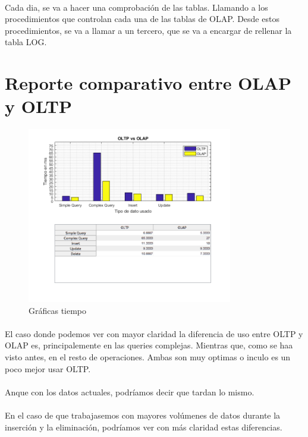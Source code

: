 \documentclass[a4paper 
,twoside
]{article}
\begin{document}
  \paragraph{}
  Cada dia, se va a hacer una comprobación de las tablas. Llamando a los procedimientos que controlan cada una de las tablas de OLAP. Desde estos procedimientos, se va a llamar a un tercero, que se va a encargar de rellenar la tabla LOG.
\pagebreak
\section{Reporte comparativo entre OLAP y OLTP}
  \begin{figure}[H]
    \centering
    \includegraphics[width=0.8\textwidth]{graficas.png}
    \caption{Gráficas tiempo}
    \label{fig:specular}
  \end{figure}

\paragraph{}
El caso donde podemos ver con mayor claridad la diferencia de uso entre OLTP y OLAP es, principalemente en las queries complejas. Mientras que, como se haa visto antes, en el resto de operaciones. Ambas son muy optimas o inculo es un poco mejor usar OLTP.

\paragraph{}
Anque con los datos actuales, podríamos decir que tardan lo mismo.

\paragraph{}
En el caso de que trabajasemos con mayores volúmenes de datos durante la inserción y la eliminación, podríamos ver con más claridad estas diferencias.
\end{document}
